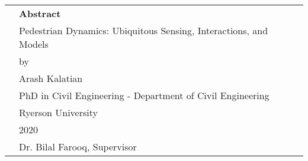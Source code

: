 \thispagestyle{plain}

\begin{table}[!h]
\centering

\begin{tabu}{X[0.1,c] X[0.5,c] X[0.1,c]}
    &\textbf{Abstract}&\\[1em]
    &Pedestrian Dynamics: Ubiquitous Sensing, Interactions, and Models&\\[0.7em]
    &by&\\[0.7em]
    &Arash Kalatian&\\[0.7em]
    &PhD in Civil Engineering - Department of Civil Engineering&\\[0.7em]
    &Ryerson University&\\[0.7em]
    &2020&\\[1em]
    &Dr. Bilal Farooq, Supervisor&\\[1em]
\end{tabu}
\end{table}

